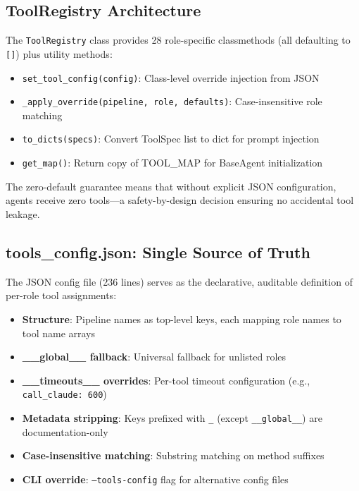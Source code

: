\subsection{ToolRegistry Architecture}

The \texttt{ToolRegistry} class provides 28 role-specific classmethods (all defaulting to \texttt{[]}) plus utility methods:
\begin{itemize}
    \item \texttt{set\_tool\_config(config)}: Class-level override injection from JSON
    \item \texttt{\_apply\_override(pipeline, role, defaults)}: Case-insensitive role matching
    \item \texttt{to\_dicts(specs)}: Convert ToolSpec list to dict for prompt injection
    \item \texttt{get\_map()}: Return copy of TOOL\_MAP for BaseAgent initialization
\end{itemize}

The zero-default guarantee means that without explicit JSON configuration, agents receive zero tools---a safety-by-design decision ensuring no accidental tool leakage.

\subsection{tools\_config.json: Single Source of Truth}

The JSON config file (236 lines) serves as the declarative, auditable definition of per-role tool assignments:

\begin{itemize}
    \item \textbf{Structure}: Pipeline names as top-level keys, each mapping role names to tool name arrays
    \item \textbf{\_\_global\_\_ fallback}: Universal fallback for unlisted roles
    \item \textbf{\_\_timeouts\_\_ overrides}: Per-tool timeout configuration (e.g., \texttt{call\_claude: 600})
    \item \textbf{Metadata stripping}: Keys prefixed with \texttt{\_} (except \texttt{\_\_global\_\_}) are documentation-only
    \item \textbf{Case-insensitive matching}: Substring matching on method suffixes
    \item \textbf{CLI override}: \texttt{--tools-config} flag for alternative config files
\end{itemize}

